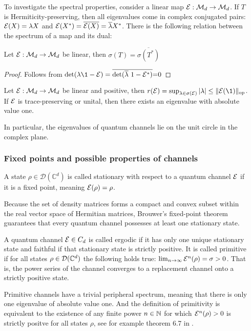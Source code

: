 To investigate the spectral properties, consider a linear map $\mathcal E:\mathcal M_d \rightarrow \mathcal M_d$. If $T$ is Hermiticity-preserving, then all eigenvalues come in complex conjugated pairs: $\mathcal E(X) = \lambda X$ and $\mathcal E(X^*)=\overline{\mathcal E(X)}=\overline{\lambda}X^*$. There is the following relation between the spectrum of a map and its dual:
\begin{prop}Let $\mathcal E:\mathcal M_d\rightarrow \mathcal M_d$ be linear, then $\sigma(T)=\overline{\sigma(T^*)}$
\end{prop}
\begin{proof}Follows from 
$\det(\lambda \1 - \m E)=\overline{\det(\overline \lambda \ 1 -\m E^*)}{=}0$
\end{proof}
\begin{prop}
    Let $\mathcal E:\mathcal M_d \rightarrow \mathcal M_d$ be linear and positive, then $r(\m E) = \sup_{\lambda \in \sigma(\m E)}|\lambda| \leq \norm{\m E(\1)}_\text{op}$. If $\mathcal E$ is trace-preserving or unital, then there exists an eigenvalue with absolute value one.
\end{prop}
In particular, the eigenvalues of quantum channels lie on the unit circle in the complex plane.

\subsubsection{Fixed points and possible properties of channels}
\begin{definition}
    A state $\rho \in \mathcal{D}(\mathbb{C}^d)$ is called stationary with respect to a quantum channel $\mathcal E$ if it is a fixed point, meaning $\mathcal E(\rho) = \rho$.
\end{definition}
Because the set of density matrices forms a compact and convex subset within the real vector space of Hermitian matrices, Brouwer's fixed-point theorem guarantees that every quantum channel possesses at least one stationary state.
\begin{definition}\label{def:primitive-etc}
A quantum channel $\mathcal E \in C_d$ is called ergodic if it has only one unique stationary state and faithful if that stationary state is strictly positive. It is called primitive if for all states $\rho \in \mathcal D(\mathbb{C}^d)$ the following holds true: $\lim_{n\rightarrow \infty} \mathcal E^n(\rho) = \sigma>0$. That is, the power series of the channel converges to a replacement channel onto a strictly positive state.
\end{definition}
Primitive channels have a trivial peripheral spectrum, meaning that there is only one eigenvalue of absolute value one. And the definition of primitivity is equivalent to the existence of any finite power $n \in \mathbb{N}$ for which $\mathcal E^n(\rho)>0$ is strictly positve for all states $\rho$, see for example theorem 6.7 in \cite{wolf2012quantum}.

